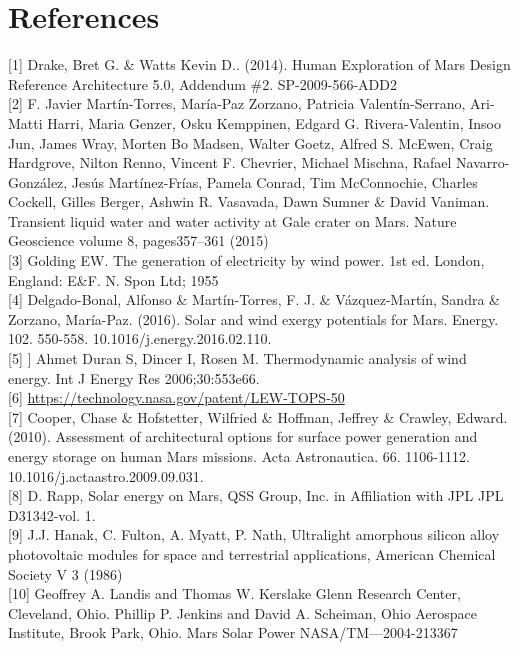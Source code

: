 \documentclass[12pt]{IEEEtran}
\begin{document}
\section*{References}
\begin{small}
{[1]} Drake, Bret G. \& Watts Kevin D.. (2014). Human Exploration of Mars Design Reference Architecture 5.0, Addendum \#2. SP-2009-566-ADD2
\\
{[2]} F. Javier Martín-Torres, María-Paz Zorzano, Patricia Valentín-Serrano, Ari-Matti Harri, Maria Genzer, Osku Kemppinen, Edgard G. Rivera-Valentin, Insoo Jun, James Wray, Morten Bo Madsen, Walter Goetz, Alfred S. McEwen, Craig Hardgrove, Nilton Renno, Vincent F. Chevrier, Michael Mischna, Rafael Navarro-González, Jesús Martínez-Frías, Pamela Conrad, Tim McConnochie, Charles Cockell, Gilles Berger, Ashwin R. Vasavada, Dawn Sumner \& David Vaniman. Transient liquid water and water activity at Gale crater on Mars. Nature Geoscience volume 8, pages357–361 (2015)
\\
{[3]} Golding EW. The generation of electricity by wind power. 1st ed. London, England: E\&F. N. Spon Ltd; 1955
\\
{[4]} Delgado-Bonal, Alfonso \& Martín-Torres, F. J. \& Vázquez-Martín, Sandra \& Zorzano, María-Paz. (2016). Solar and wind exergy potentials for Mars. Energy. 102. 550-558. 10.1016/j.energy.2016.02.110.
\\
{[5]} ] Ahmet Duran S, Dincer I, Rosen M. Thermodynamic analysis of wind energy. Int J Energy Res 2006;30:553e66.
\\
{[6]} \url{https://technology.nasa.gov/patent/LEW-TOPS-50}
\\
{[7]} Cooper, Chase \& Hofstetter, Wilfried \& Hoffman, Jeffrey \& Crawley, Edward. (2010). Assessment of architectural options for surface power generation and energy storage on human Mars missions. Acta Astronautica. 66. 1106-1112. 10.1016/j.actaastro.2009.09.031.
\\
{[8]} D. Rapp, Solar energy on Mars, QSS Group, Inc. in Affiliation with JPL JPL D31342-vol. 1.
\\
{[9]} J.J. Hanak, C. Fulton, A. Myatt, P. Nath, Ultralight amorphous silicon alloy photovoltaic modules for space and terrestrial applications, American Chemical Society V 3 (1986)
\\
{[10]} Geoffrey A. Landis and Thomas W. Kerslake
Glenn Research Center, Cleveland, Ohio. Phillip P. Jenkins and David A. Scheiman, Ohio Aerospace Institute, Brook Park, Ohio. Mars Solar Power NASA/TM—2004-213367

\end{small}
\end{document}
